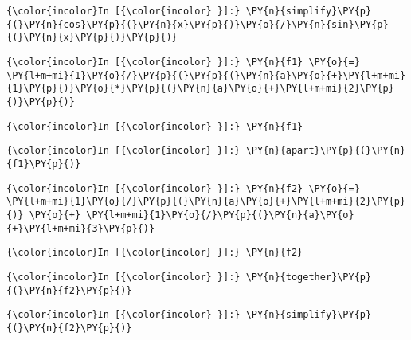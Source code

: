     \begin{Verbatim}[commandchars=\\\{\}]
{\color{incolor}In [{\color{incolor} }]:} \PY{n}{simplify}\PY{p}{(}\PY{n}{cos}\PY{p}{(}\PY{n}{x}\PY{p}{)}\PY{o}{/}\PY{n}{sin}\PY{p}{(}\PY{n}{x}\PY{p}{)}\PY{p}{)}
\end{Verbatim}





    \begin{Verbatim}[commandchars=\\\{\}]
{\color{incolor}In [{\color{incolor} }]:} \PY{n}{f1} \PY{o}{=} \PY{l+m+mi}{1}\PY{o}{/}\PY{p}{(}\PY{p}{(}\PY{n}{a}\PY{o}{+}\PY{l+m+mi}{1}\PY{p}{)}\PY{o}{*}\PY{p}{(}\PY{n}{a}\PY{o}{+}\PY{l+m+mi}{2}\PY{p}{)}\PY{p}{)}
\end{Verbatim}

    \begin{Verbatim}[commandchars=\\\{\}]
{\color{incolor}In [{\color{incolor} }]:} \PY{n}{f1}
\end{Verbatim}

    \begin{Verbatim}[commandchars=\\\{\}]
{\color{incolor}In [{\color{incolor} }]:} \PY{n}{apart}\PY{p}{(}\PY{n}{f1}\PY{p}{)}
\end{Verbatim}

    \begin{Verbatim}[commandchars=\\\{\}]
{\color{incolor}In [{\color{incolor} }]:} \PY{n}{f2} \PY{o}{=} \PY{l+m+mi}{1}\PY{o}{/}\PY{p}{(}\PY{n}{a}\PY{o}{+}\PY{l+m+mi}{2}\PY{p}{)} \PY{o}{+} \PY{l+m+mi}{1}\PY{o}{/}\PY{p}{(}\PY{n}{a}\PY{o}{+}\PY{l+m+mi}{3}\PY{p}{)}
\end{Verbatim}

    \begin{Verbatim}[commandchars=\\\{\}]
{\color{incolor}In [{\color{incolor} }]:} \PY{n}{f2}
\end{Verbatim}

    \begin{Verbatim}[commandchars=\\\{\}]
{\color{incolor}In [{\color{incolor} }]:} \PY{n}{together}\PY{p}{(}\PY{n}{f2}\PY{p}{)}
\end{Verbatim}



    \begin{Verbatim}[commandchars=\\\{\}]
{\color{incolor}In [{\color{incolor} }]:} \PY{n}{simplify}\PY{p}{(}\PY{n}{f2}\PY{p}{)}
\end{Verbatim}









